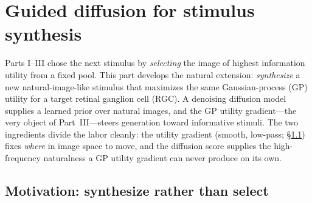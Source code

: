 
\section{Guided diffusion for stimulus synthesis}\label{sec:diffusion}

Parts I--III chose the next stimulus by \emph{selecting} the image of highest
information utility from a fixed pool. This part develops the natural extension:
\emph{synthesize} a new natural-image-like stimulus that maximizes the same
Gaussian-process (GP) utility for a target retinal ganglion cell (RGC). A
denoising diffusion model supplies a learned prior over natural images, and the
GP utility gradient---the very object of Part~III---steers generation toward
informative stimuli. The two ingredients divide the labor cleanly: the utility
gradient (smooth, low-pass; \S\ref{sec:diff-motiv}) fixes \emph{where} in image
space to move, and the diffusion score supplies the high-frequency naturalness a
GP utility gradient can never produce on its own.


\subsection{Motivation: synthesize rather than select}\label{sec:diff-motiv}


